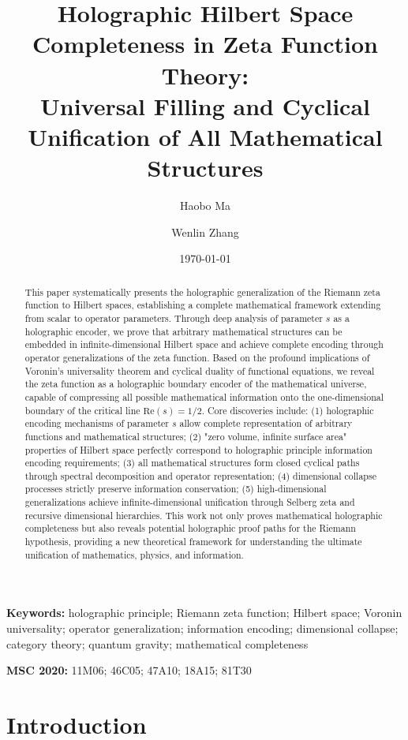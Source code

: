 \documentclass[12pt]{article}
\title{Holographic Hilbert Space Completeness in Zeta Function Theory: \\
Universal Filling and Cyclical Unification of All Mathematical Structures}
\author{Haobo Ma \and Wenlin Zhang}
\date{\today}
\begin{document}
\maketitle

\begin{abstract}
This paper systematically presents the holographic generalization of the Riemann zeta function to Hilbert spaces, establishing a complete mathematical framework extending from scalar to operator parameters. Through deep analysis of parameter $s$ as a holographic encoder, we prove that arbitrary mathematical structures can be embedded in infinite-dimensional Hilbert space and achieve complete encoding through operator generalizations of the zeta function. Based on the profound implications of Voronin's universality theorem and cyclical duality of functional equations, we reveal the zeta function as a holographic boundary encoder of the mathematical universe, capable of compressing all possible mathematical information onto the one-dimensional boundary of the critical line $\text{Re}(s) = 1/2$. Core discoveries include: (1) holographic encoding mechanisms of parameter $s$ allow complete representation of arbitrary functions and mathematical structures; (2) "zero volume, infinite surface area" properties of Hilbert space perfectly correspond to holographic principle information encoding requirements; (3) all mathematical structures form closed cyclical paths through spectral decomposition and operator representation; (4) dimensional collapse processes strictly preserve information conservation; (5) high-dimensional generalizations achieve infinite-dimensional unification through Selberg zeta and recursive dimensional hierarchies. This work not only proves mathematical holographic completeness but also reveals potential holographic proof paths for the Riemann hypothesis, providing a new theoretical framework for understanding the ultimate unification of mathematics, physics, and information.
\end{abstract}

\textbf{Keywords:} holographic principle; Riemann zeta function; Hilbert space; Voronin universality; operator generalization; information encoding; dimensional collapse; category theory; quantum gravity; mathematical completeness

\textbf{MSC 2020:} 11M06; 46C05; 47A10; 18A15; 81T30

\section{Introduction}
\end{document}
